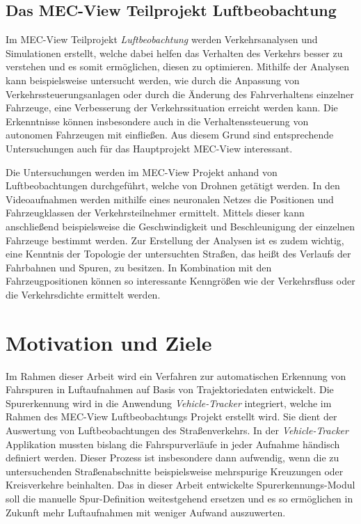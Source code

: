 \subsection{Das MEC-View Teilprojekt Luftbeobachtung}
\label{sec:mecview_sim}

Im MEC-View Teilprojekt \textit{Luftbeobachtung} werden Verkehrsanalysen und Simulationen erstellt, welche dabei helfen
das Verhalten des Verkehrs besser zu verstehen und es somit ermöglichen, diesen zu optimieren.
Mithilfe der Analysen kann beispielsweise untersucht werden, wie durch die Anpassung von Verkehrssteuerungsanlagen
oder durch die Änderung des Fahrverhaltens einzelner Fahrzeuge, eine Verbesserung der Verkehrssituation erreicht werden kann.
Die Erkenntnisse können insbesondere auch in die Verhaltenssteuerung von autonomen Fahrzeugen mit einfließen.
Aus diesem Grund sind entsprechende Untersuchungen auch für das Hauptprojekt MEC-View interessant.

Die Untersuchungen werden im MEC-View Projekt anhand von Luftbeobachtungen durchgeführt, welche von Drohnen getätigt werden.
In den Videoaufnahmen werden mithilfe eines neuronalen Netzes die Positionen und Fahrzeugklassen der Verkehrsteilnehmer ermittelt.
Mittels dieser kann anschließend beispielsweise die Geschwindigkeit und Beschleunigung der einzelnen Fahrzeuge bestimmt werden.
Zur Erstellung der Analysen ist es zudem wichtig, eine Kenntnis der Topologie der untersuchten Straßen, das heißt des
Verlaufs der Fahrbahnen und Spuren, zu besitzen. In Kombination mit den Fahrzeugpositionen können so interessante
Kenngrößen wie der Verkehrsfluss oder die Verkehrsdichte ermittelt werden.

\section{Motivation und Ziele}
\label{sec:motivation_goals}

Im Rahmen dieser Arbeit wird ein Verfahren zur automatischen Erkennung von Fahrspuren in Luftaufnahmen
auf Basis von Trajektoriedaten entwickelt. Die Spurerkennung wird in die Anwendung \textit{Vehicle-Tracker}
integriert, welche im Rahmen des MEC-View Luftbeobachtungs Projekt erstellt wird. Sie dient der Auswertung
von Luftbeobachtungen des Straßenverkehrs.
In der \textit{Vehicle-Tracker} Applikation mussten bislang die Fahrspurverläufe in jeder Aufnahme
händisch definiert werden. Dieser Prozess ist insbesondere dann aufwendig, wenn die zu untersuchenden
Straßenabschnitte beispielsweise mehrspurige Kreuzungen oder Kreisverkehre beinhalten. Das in dieser Arbeit
entwickelte Spurerkennungs-Modul soll die manuelle Spur-Definition weitestgehend ersetzen und es so ermöglichen
in Zukunft mehr Luftaufnahmen mit weniger Aufwand auszuwerten.

